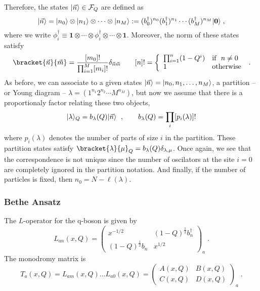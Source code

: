\documentclass[a4paper,11pt]{amsart}
\begin{document}
Therefore, the states \(\lvert\vec{n}\rangle \in \mathcal{F}_Q\) are defined as 
\begin{equation}
  \lvert\vec{n}\rangle = \lvert n_0\rangle\otimes \lvert n_1\rangle \otimes \cdots \otimes \lvert n_M\rangle 
 : =  (b_0^\dagger)^{n_0} (b_1^\dagger)^{n_1} \cdots  (b_M^\dagger)^{n_M} \lvert\bm{0}\rangle \; ,
\end{equation}
where we write \(\phi_i^\dagger \equiv \bm{1} \otimes  \cdots \otimes
\phi_i^\dagger \otimes \cdots \otimes \bm{1}\).
Moreover, the norm of these states satisfy 
\begin{equation}
  \bracket{\vec{n}}{\vec{m}} = \frac{[m_0]!}{\prod_{i=1}^M[m_i]!} \delta_{\vec{n}\vec{m}}\qquad 
    [n]! =
    \left\{
    \begin{array}{ll}
    \prod_{i=1}^n(1 - Q^i) & \textrm{if}\ \ n\neq 0 \\
    1 & \textrm{otherwise}
  \end{array}\right.\; .
\end{equation}
As before, we can associate to a given states \(\lvert\vec{n}\rangle =
\lvert n_0, n_1, \dots, n_M\rangle\), a partition -- or Young diagram --
\(\lambda = (1^{n_1} 2^{n_2} \cdots M^{n_M})\), but now we assume that 
there is a proportionaly  factor relating these two objects, 
\begin{equation}
  \lvert\lambda\rangle_Q  = b_\lambda(Q) \lvert\vec{n}\rangle  \ \; , \qquad b_\lambda(Q) = \prod_i [p_i(\lambda)]! 
\end{equation}
where \(p_i(\lambda)\) denotes the number of parts of size \(i\) in
the partition. These partition states satisfy \(
\bracket{\lambda}{\mu}_Q = b_\lambda(Q) \delta_{\lambda,\mu}\). Once
again, we see that the correspondence is not unique since the number
of oscilators at the site \(i=0\) are completely ignored in the
partition notation. And finally, if the number of particles is fixed,
then \(n_0 = N - \ell(\lambda)\).

\subsubsection{Bethe Ansatz}
The \(L\)-operator for the q-boson is given by
\begin{equation}
  L_{an}(x, Q) =
  \begin{pmatrix}
    x^{-1/2} & (1 - Q)^{\frac{1}{2}} b_n^\dagger \\ (1 - Q)^{\frac{1}{2}} b_n & x^{1/2}
  \end{pmatrix}_a\; .
\end{equation}
The monodromy matrix is 
\begin{equation}
  T_a(x,Q) = L_{am}(x, Q)  \dots  L_{a0}(x, Q) = 
  \begin{pmatrix}
    A(x, Q) & B(x, Q) \\ C(x, Q) & D(x, Q)
  \end{pmatrix}_a\; .
\end{equation}
\end{document}
